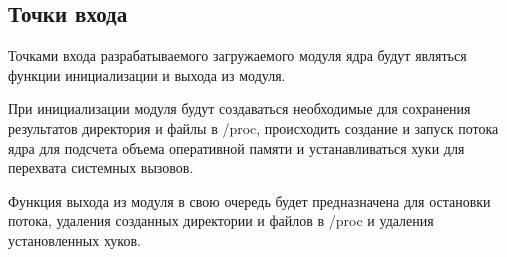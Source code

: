 \subsection{Точки входа}

Точками входа разрабатываемого загружаемого модуля ядра будут являться функции инициализации и выхода из модуля.

При инициализации модуля будут создаваться необходимые для сохранения результатов директория и файлы в /proc, происходить создание и запуск потока ядра для подсчета объема оперативной памяти и устанавливаться хуки для перехвата системных вызовов.

Функция выхода из модуля в свою очередь будет предназначена для остановки потока, удаления созданных директории и файлов в /proc и удаления установленных хуков.